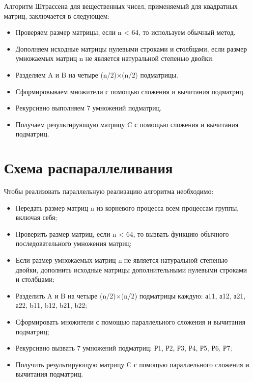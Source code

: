 \documentclass{report}
\begin{document}
Алгоритм Штрассена для вещественных чисел, применяемый для квадратных матриц, заключается в следующем:
\begin{itemize}
    \item Проверяем размер матрицы, если n < 64, то используем обычный метод.
    \item Дополняем исходные матрицы нулевыми строками и столбцами, если размер умножаемых матриц n не является натуральной степенью двойки. 
    \item Разделяем A и B на четыре (n/2)×(n/2) подматрицы.
    \item Сформировываем множители с помощью сложения и вычитания подматриц.
    \item Рекурсивно выполняем 7 умножений подматриц.
    \item Получаем результирующую матрицу C с помощью сложения и вычитания подматриц.
\end{itemize}
\newpage

\section*{Схема распараллеливания}
Чтобы реализовать параллельную реализацию алгоритма необходимо:
\begin{itemize}
    \item Передать размер матриц n из корневого процесса всем процессам группы, включая себя;
    \item Проверить размер матриц, если n < 64, то вызвать функцию обычного последовательного умножения матриц;
    \item Если размер умножаемых матриц n не является натуральной степенью двойки, дополнить исходные матрицы дополнительными нулевыми строками и столбцами;
    \item Разделить A и B на четыре (n/2)×(n/2) подматрицы каждую: а11, а12, а21, а22, b11, b12, b21, b22;
    \item Сформировать множители с помощью параллельного сложения и вычитания подматриц;
    \item Рекурсивно вызвать 7 умножений подматриц: Р1, Р2, Р3, Р4, Р5, Р6, Р7;
    \item Получить результирующую матрицу C с помощью параллельного сложения и вычитания подматриц.
    
\end{itemize}
\newpage

\end{document}
